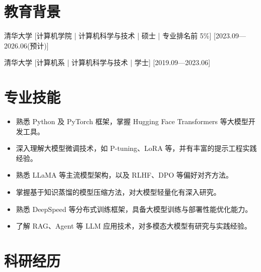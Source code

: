 \documentclass{resume-photo}
\begin{document}

\ResumeTitle




\section{教育背景}
\ResumeItem
{清华大学}
[\textnormal{计算机学院 | 计算机科学与技术 | 硕士 | 专业排名前 5\%}]
[2023.09—2026.06(预计)]

\ResumeItem
{清华大学}
[\textnormal{计算机系 | 计算机科学与技术 | 学士}]
[2019.09—2023.06]

\section{专业技能}
\begin{itemize}
  \item 熟悉 Python 及 PyTorch 框架，掌握 Hugging Face Transformers 等大模型开发工具。
  \item 深入理解大模型微调技术，如 P-tuning、LoRA 等，并有丰富的提示工程实践经验。
  \item 熟悉 LLaMA 等主流模型架构，以及 RLHF、DPO 等偏好对齐方法。
  \item 掌握基于知识蒸馏的模型压缩方法，对大模型轻量化有深入研究。
  \item 熟悉 DeepSpeed 等分布式训练框架，具备大模型训练与部署性能优化能力。
  \item 了解 RAG、Agent 等 LLM 应用技术，对多模态大模型有研究与实践经验。
\end{itemize}

\section{科研经历}
\end{document}
